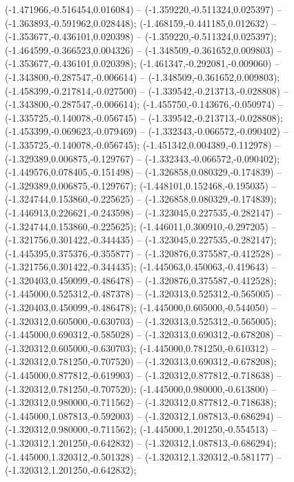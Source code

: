  (-1.471966,-0.516454,0.016084) -- (-1.359220,-0.511324,0.025397) -- (-1.363893,-0.591962,0.028448);
 (-1.468159,-0.441185,0.012632) -- (-1.353677,-0.436101,0.020398) -- (-1.359220,-0.511324,0.025397);
 (-1.464599,-0.366523,0.004326) -- (-1.348509,-0.361652,0.009803) -- (-1.353677,-0.436101,0.020398);
 (-1.461347,-0.292081,-0.009060) -- (-1.343800,-0.287547,-0.006614) -- (-1.348509,-0.361652,0.009803);
 (-1.458399,-0.217814,-0.027500) -- (-1.339542,-0.213713,-0.028808) -- (-1.343800,-0.287547,-0.006614);
 (-1.455750,-0.143676,-0.050974) -- (-1.335725,-0.140078,-0.056745) -- (-1.339542,-0.213713,-0.028808);
 (-1.453399,-0.069623,-0.079469) -- (-1.332343,-0.066572,-0.090402) -- (-1.335725,-0.140078,-0.056745);
 (-1.451342,0.004389,-0.112978) -- (-1.329389,0.006875,-0.129767) -- (-1.332343,-0.066572,-0.090402);
 (-1.449576,0.078405,-0.151498) -- (-1.326858,0.080329,-0.174839) -- (-1.329389,0.006875,-0.129767);
 (-1.448101,0.152468,-0.195035) -- (-1.324744,0.153860,-0.225625) -- (-1.326858,0.080329,-0.174839);
 (-1.446913,0.226621,-0.243598) -- (-1.323045,0.227535,-0.282147) -- (-1.324744,0.153860,-0.225625);
 (-1.446011,0.300910,-0.297205) -- (-1.321756,0.301422,-0.344435) -- (-1.323045,0.227535,-0.282147);
 (-1.445395,0.375376,-0.355877) -- (-1.320876,0.375587,-0.412528) -- (-1.321756,0.301422,-0.344435);
 (-1.445063,0.450063,-0.419643) -- (-1.320403,0.450099,-0.486478) -- (-1.320876,0.375587,-0.412528);
 (-1.445000,0.525312,-0.487378) -- (-1.320313,0.525312,-0.565005) -- (-1.320403,0.450099,-0.486478);
 (-1.445000,0.605000,-0.544050) -- (-1.320312,0.605000,-0.630703) -- (-1.320313,0.525312,-0.565005);
 (-1.445000,0.690312,-0.585028) -- (-1.320313,0.690312,-0.678208) -- (-1.320312,0.605000,-0.630703);
 (-1.445000,0.781250,-0.610312) -- (-1.320312,0.781250,-0.707520) -- (-1.320313,0.690312,-0.678208);
 (-1.445000,0.877812,-0.619903) -- (-1.320312,0.877812,-0.718638) -- (-1.320312,0.781250,-0.707520);
 (-1.445000,0.980000,-0.613800) -- (-1.320312,0.980000,-0.711562) -- (-1.320312,0.877812,-0.718638);
 (-1.445000,1.087813,-0.592003) -- (-1.320312,1.087813,-0.686294) -- (-1.320312,0.980000,-0.711562);
 (-1.445000,1.201250,-0.554513) -- (-1.320312,1.201250,-0.642832) -- (-1.320312,1.087813,-0.686294);
 (-1.445000,1.320312,-0.501328) -- (-1.320312,1.320312,-0.581177) -- (-1.320312,1.201250,-0.642832);
